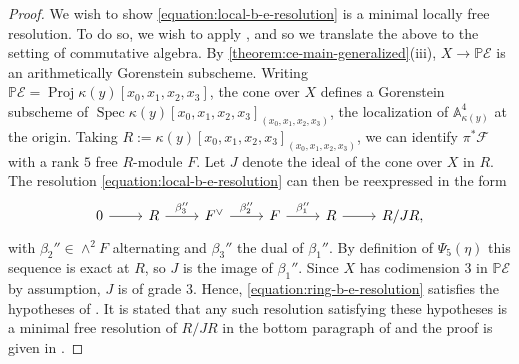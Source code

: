 \documentclass[12 pt]{amsart}
\theoremstyle{plain}
\theoremstyle{definition}
\theoremstyle{remark}
\numberwithin{equation}{section}
\newcommand\bp{\mathbb P}
\newcommand\sce{\mathscr E}
\newcommand\scf{\mathscr F}
\DeclareMathOperator\spec{\operatorname{Spec}}
\DeclareMathOperator\proj{\operatorname{Proj}}
\begin{document}
\begin{proof}
	We wish to show \eqref{equation:local-b-e-resolution} is a minimal
	locally free resolution.
	To do so, we wish to apply
	\cite{buchsbaumE:algebra-structures-for-finite-free-resolutions-codimension-3},
	and so we translate the above to the setting of commutative algebra.
	By \autoref{theorem:ce-main-generalized}(iii),
	$X \to \bp \sce$
	is an arithmetically Gorenstein subscheme.
	Writing $\bp \sce = \proj \kappa(y)[x_0, x_1, x_2, x_3]$,
	the cone over $X$ defines a Gorenstein subscheme of
	$\spec \kappa(y)[x_0, x_1, x_2, x_3]_{(x_0, x_1, x_2, x_3)}$,
	the localization of $\mathbb A^4_{\kappa(y)}$ at the origin.
	Taking $R := \kappa(y)[x_0, x_1, x_2, x_3]_{(x_0, x_1, x_2, x_3)}$,
	we can identify $\pi^* \scf$ with a rank $5$ free $R$-module $F$.
	Let $J$ denote the ideal of the cone over $X$ in $R$.
	The resolution \eqref{equation:local-b-e-resolution} can then be
	reexpressed in the form
	\begin{equation}
		\label{equation:ring-b-e-resolution}
		\begin{tikzcd}
			0 \ar {r} & 
			R \ar{r}{\beta_3''} &
			F^\vee \ar{r}{\beta_2''} &
			F      \ar{r}{\beta_1''} &
			R \ar{r} & R/JR,
	\end{tikzcd}\end{equation}
	with $\beta_2'' \in \wedge^2 F$ alternating and $\beta_3''$ the dual
	of $\beta_1''$.
	By definition of $\Psi_5(\eta)$ this sequence is exact at $R$,
	so $J$ is the image of $\beta_1''$.
	Since $X$ has codimension $3$ in $\bp \sce$ by assumption,
	$J$ is of grade $3$. 
	Hence,
	\eqref{equation:ring-b-e-resolution} satisfies
	the hypotheses of \cite[Theorem
	2.1(1)]{buchsbaumE:algebra-structures-for-finite-free-resolutions-codimension-3}.
	It is stated that any such resolution satisfying these hypotheses is a minimal free resolution
	of $R/JR$ 
	in the bottom paragraph of
	\cite[p. 463]{buchsbaumE:algebra-structures-for-finite-free-resolutions-codimension-3}
	and the proof is given in
	\cite[p. 464]{buchsbaumE:algebra-structures-for-finite-free-resolutions-codimension-3}.
\end{proof}
\end{document}
